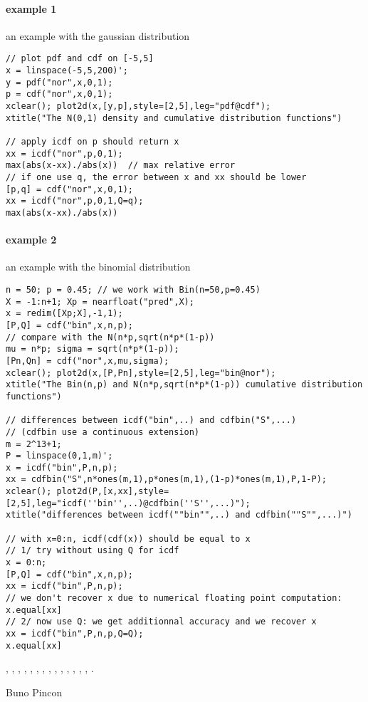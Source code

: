 \begin{examples}
  
\paragraph{example 1} an example with the gaussian distribution
\begin{Verbatim}
// plot pdf and cdf on [-5,5]
x = linspace(-5,5,200)';
y = pdf("nor",x,0,1);
p = cdf("nor",x,0,1);
xclear(); plot2d(x,[y,p],style=[2,5],leg="pdf@cdf");
xtitle("The N(0,1) density and cumulative distribution functions")

// apply icdf on p should return x
xx = icdf("nor",p,0,1);
max(abs(x-xx)./abs(x))  // max relative error
// if one use q, the error between x and xx should be lower
[p,q] = cdf("nor",x,0,1);
xx = icdf("nor",p,0,1,Q=q);
max(abs(x-xx)./abs(x))
\end{Verbatim}
  
\paragraph{example 2} an example with the binomial distribution
\begin{Verbatim}
n = 50; p = 0.45; // we work with Bin(n=50,p=0.45)
X = -1:n+1; Xp = nearfloat("pred",X);
x = redim([Xp;X],-1,1);
[P,Q] = cdf("bin",x,n,p);
// compare with the N(n*p,sqrt(n*p*(1-p))
mu = n*p; sigma = sqrt(n*p*(1-p));
[Pn,Qn] = cdf("nor",x,mu,sigma);
xclear(); plot2d(x,[P,Pn],style=[2,5],leg="bin@nor");
xtitle("The Bin(n,p) and N(n*p,sqrt(n*p*(1-p)) cumulative distribution functions")

// differences between icdf("bin",..) and cdfbin("S",...)
// (cdfbin use a continuous extension) 
m = 2^13+1;
P = linspace(0,1,m)';
x = icdf("bin",P,n,p);
xx = cdfbin("S",n*ones(m,1),p*ones(m,1),(1-p)*ones(m,1),P,1-P);
xclear(); plot2d(P,[x,xx],style=[2,5],leg="icdf(''bin'',..)@cdfbin(''S'',...)");
xtitle("differences between icdf(""bin"",..) and cdfbin(""S"",...)")

// with x=0:n, icdf(cdf(x)) should be equal to x
// 1/ try without using Q for icdf
x = 0:n;
[P,Q] = cdf("bin",x,n,p);
xx = icdf("bin",P,n,p);
// we don't recover x due to numerical floating point computation:
x.equal[xx]
// 2/ now use Q: we get additionnal accuracy and we recover x
xx = icdf("bin",P,n,p,Q=Q);
x.equal[xx]
\end{Verbatim}
 
\end{examples}

\begin{manseealso}
  , , , 
  , , ,
  , , , , 
  , , , , .
\end{manseealso}


\begin{authors}
  Buno Pincon
\end{authors}

